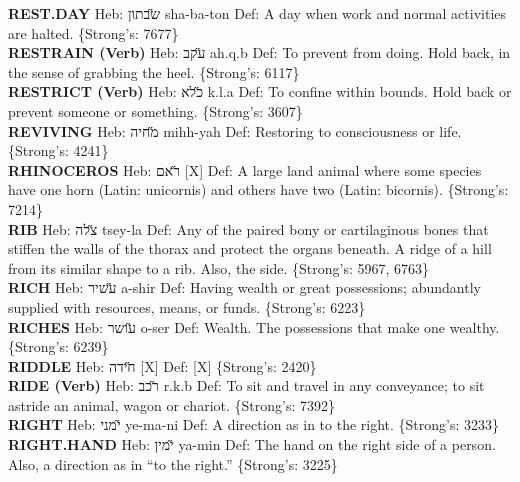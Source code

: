 {\textbf{REST.DAY} Heb: {\large\H שבתון} sha-ba-ton Def: A day when work and normal activities are halted. \{Strong's: 7677\}\hfill{}\\

\textbf{RESTRAIN (Verb)} Heb: {\large\H עקב} ah.q.b Def: To prevent from doing. Hold back, in the sense of grabbing the heel. \{Strong's: 6117\}\hfill{}\\

\textbf{RESTRICT (Verb)} Heb: {\large\H כלא} k.l.a Def: To confine within bounds. Hold back or prevent someone or something. \{Strong's: 3607\}\hfill{}\\

\textbf{REVIVING} Heb: {\large\H מחיה} mihh-yah Def: Restoring to consciousness or life. \{Strong's: 4241\}\hfill{}\\

\textbf{RHINOCEROS} Heb: {\large\H ראם} {[}X{]} Def: A large land animal where some species have one horn (Latin: unicornis) and others have two (Latin: bicornis). \{Strong's: 7214\}\hfill{}\\

\textbf{RIB} Heb: {\large\H צלה} tsey-la Def: Any of the paired bony or cartilaginous bones that stiffen the walls of the thorax and protect the organs beneath. A ridge of a hill from its similar shape to a rib. Also, the side. \{Strong's: 5967, 6763\}\hfill{}\\

\textbf{RICH} Heb: {\large\H עשיר} a-shir Def: Having wealth or great possessions; abundantly supplied with resources, means, or funds. \{Strong's: 6223\}\hfill{}\\

\textbf{RICHES} Heb: {\large\H עושר} o-ser Def: Wealth. The possessions that make one wealthy. \{Strong's: 6239\}\hfill{}\\

\textbf{RIDDLE} Heb: {\large\H חידה} {[}X{]} Def: {[}X{]} \{Strong's: 2420\}\hfill{}\\

\textbf{RIDE (Verb)} Heb: {\large\H רכב} r.k.b Def: To sit and travel in any conveyance; to sit astride an animal, wagon or chariot. \{Strong's: 7392\}\hfill{}\\

\textbf{RIGHT} Heb: {\large\H ימני} ye-ma-ni Def: A direction as in to the right. \{Strong's: 3233\}\hfill{}\\

\textbf{RIGHT.HAND} Heb: {\large\H ימין} ya-min Def: The hand on the right side of a person. Also, a direction as in ``to the right.'' \{Strong's: 3225\}\hfill{}\\

}

